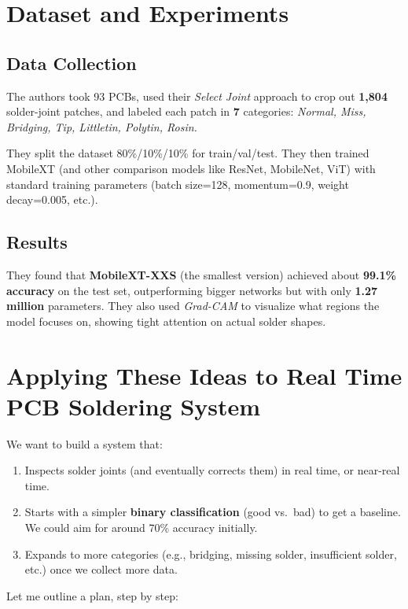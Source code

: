 \documentclass{article}
\begin{document}
\section{Dataset and Experiments}

\subsection{Data Collection }

The authors took 93 PCBs, used their \emph{Select Joint} approach to crop out \textbf{1,804} solder-joint patches, 
and labeled each patch in \textbf{7} categories: 
\emph{Normal, Miss, Bridging, Tip, Littletin, Polytin, Rosin.}

They split the dataset 80\%/10\%/10\% for train/val/test. 
They then trained MobileXT (and other comparison models like ResNet, MobileNet, ViT) with standard training parameters (batch size=128, momentum=0.9, weight decay=0.005, etc.). 

\subsection{Results}

They found that \textbf{MobileXT-XXS} (the smallest version) achieved about \textbf{99.1\% accuracy} on the test set, 
outperforming bigger networks but with only \textbf{1.27 million} parameters. 
They also used \emph{Grad-CAM} to visualize what regions the model focuses on, showing tight attention on actual solder shapes.

\section{Applying These Ideas to Real Time PCB Soldering System}

We want to build a system that:
\begin{enumerate}
    \item Inspects solder joints (and eventually corrects them) in real time, or near-real time.
    \item Starts with a simpler \textbf{binary classification} (good vs.\ bad) to get a baseline. We could aim for around 70\% accuracy initially.
    \item Expands to more categories (e.g., bridging, missing solder, insufficient solder, etc.) once we collect more data.
\end{enumerate}

Let me outline a plan, step by step:
\end{document}
